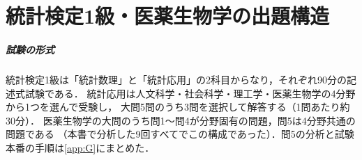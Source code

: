 \documentclass[a4paper,11pt,openany]{ltjsbook}
\begin{document}
\chapter*{統計検定1級・医薬生物学の出題構造}

\paragraph{試験の形式}
統計検定1級は「統計数理」と「統計応用」の2科目からなり，それぞれ90分の記述式試験である．
統計応用は人文科学・社会科学・理工学・医薬生物学の4分野から1つを選んで受験し，
大問5問のうち3問を選択して解答する（1問あたり約30分）\cite{web:lec,web:academaid}．
医薬生物学の大問のうち問1〜問4が分野固有の問題，問5は4分野共通の問題である
（本書で分析した9回すべてでこの構成であった）．問5の分析と試験本番の手順は\cref{app:G}にまとめた．
\end{document}
